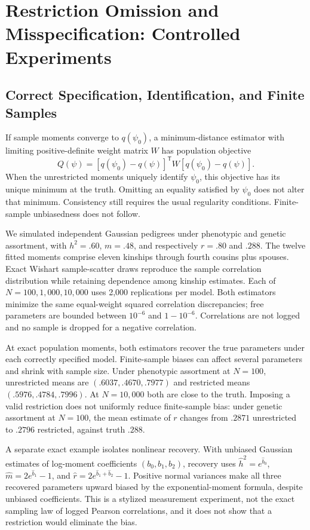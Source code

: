 \section{Restriction Omission and Misspecification: Controlled Experiments}
\label{app:restriction-simulations}
\subsection{Correct Specification, Identification, and Finite Samples}
If sample moments converge to $q(\psi_0)$, a minimum-distance estimator
with limiting positive-definite weight matrix $W$ has population objective
\[
 Q(\psi)=[q(\psi_0)-q(\psi)]^{\mathsf T}W[q(\psi_0)-q(\psi)].
\]
When the unrestricted moments uniquely identify $\psi_0$, this objective
has its unique minimum at the truth. Omitting an equality satisfied by
$\psi_0$ does not alter that minimum. Consistency still requires the usual
regularity conditions. Finite-sample unbiasedness does not follow.

We simulated independent Gaussian pedigrees under phenotypic and genetic
assortment, with $h^2=.60$, $m=.48$, and respectively $r=.80$ and $.288$.
The twelve fitted moments comprise eleven kinships through fourth cousins
plus spouses. Exact Wishart sample-scatter draws reproduce the sample
correlation distribution while retaining dependence among kinship estimates.
Each of $N=100,1{,}000,10{,}000$ uses 2,000 replications per model. Both
estimators minimize the same equal-weight squared correlation discrepancies;
free parameters are bounded between $10^{-6}$ and $1-10^{-6}$. Correlations
are not logged and no sample is dropped for a negative correlation.

At exact population moments, both estimators recover the true parameters
under each correctly specified model. Finite-sample biases can affect
several parameters and shrink with sample size. Under phenotypic assortment
at $N=100$, unrestricted means are $(.6037,.4670,.7977)$ and restricted
means $(.5976,.4784,.7996)$. At $N=10{,}000$ both are close to the truth.
Imposing a valid restriction does not uniformly reduce finite-sample bias:
under genetic assortment at $N=100$, the mean estimate of $r$ changes from
$.2871$ unrestricted to $.2796$ restricted, against truth $.288$.

A separate exact example isolates nonlinear recovery. With unbiased
Gaussian estimates of log-moment coefficients $(b_0,b_1,b_2)$, recovery
uses $\widehat h^2=e^{\widehat b_0}$,
$\widehat m=2e^{\widehat b_1}-1$, and
$\widehat r=2e^{\widehat b_1+\widehat b_2}-1$.
Positive normal variances make all three recovered parameters upward
biased by the exponential-moment formula, despite unbiased coefficients.
This is a stylized measurement experiment, not the exact sampling law of
logged Pearson correlations, and it does not show that a restriction
would eliminate the bias.

